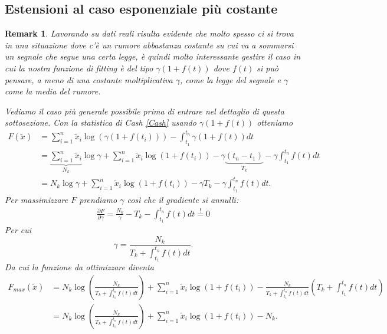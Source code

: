 \documentclass[10pt,a4paper]{report}
\newtheorem{remark}{Remark}
\begin{document}
\subsection{Estensioni al caso esponenziale più costante}
\begin{remark}
Lavorando su dati reali risulta evidente che molto spesso ci si trova in una situazione dove c'è un rumore abbastanza costante su cui va a sommarsi un segnale che segue una certa legge, è quindi molto interessante gestire il caso in cui la nostra funzione di fitting è del tipo $\gamma(1+f(t))$ dove $f(t)$ si può pensare, a meno di una costante moltiplicativa $\gamma$, come la legge del segnale e $\gamma$ come la media del rumore. 

Vediamo il caso più generale possibile prima di entrare nel dettaglio di questa sottosezione. Con la statistica di Cash \eqref{Cash} usando $\gamma(1+f(t))$ otteniamo
\begin{align}
F(\tilde{x}) &= \sum_{i=1}^n\tilde{x}_i\log(\gamma(1+f(t_i)))-\int_{t_1}^{t_n}\gamma(1+f(t)) dt \nonumber\\
&= \underbrace{\sum_{i=1}^n\tilde{x}_i}_{N_k}\log\gamma + \sum_{i=1}^n\tilde{x}_i\log(1+f(t_i))-\gamma\underbrace{(t_n-t_1)}_{T_k}-\gamma\int_{t_1}^{t_n}f(t) dt\nonumber\\
&= N_k\log\gamma + \sum_{i=1}^n\tilde{x}_i\log(1+f(t_i)) -\gamma T_k -\gamma\int_{t_1}^{t_n}f(t) dt.\label{cash_gamma}
\end{align}
Per massimizzare $F$ prendiamo $\gamma$ così che il gradiente si annulli:
\begin{gather*}
\frac{\partial F}{\partial\gamma}=\frac{N_k}{\gamma}-T_k-\int_{t_1}^{t_n}f(t) dt\stackrel{!}{=}0
\end{gather*}
Per cui
\begin{equation}
\gamma = \frac{N_k}{T_k+\int_{t_1}^{t_n}f(t)dt}.\label{gamma_opt}
\end{equation}
Da cui la funzione da ottimizzare diventa
\begin{align}\nonumber
F_{max}(\tilde{x}) &= N_k\log\left(\frac{N_k}{T_k+\int_{t_1}^{t_n}f(t)dt}\right) + \sum_{i=1}^n\tilde{x}_i\log(1+f(t_i)) -\frac{N_k}{T_k+\int_{t_1}^{t_n}f(t)dt} \left(T_k +\int_{t_1}^{t_n}f(t) dt\right)\\
&= N_k\log\left(\frac{N_k}{T_k+\int_{t_1}^{t_n}f(t)dt}\right) + \sum_{i=1}^n\tilde{x}_i\log(1+f(t_i)) -N_k.\label{c_plus_cash_max}
\end{align}
\end{remark}
\end{document}

